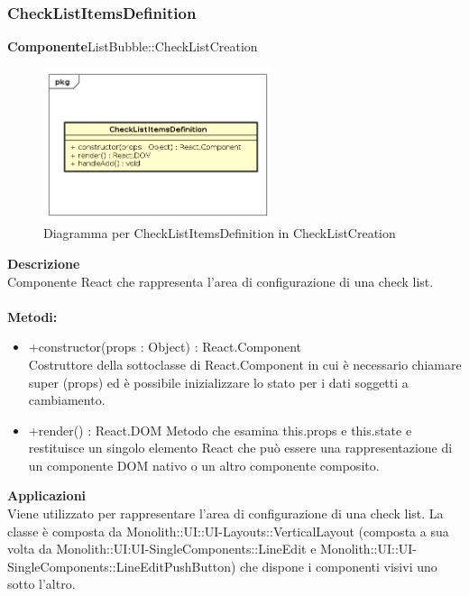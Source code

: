 \subsubsection{CheckListItemsDefinition}
\textbf{Componente}ListBubble::CheckListCreation\\
   \FloatBarrier
   \begin{figure}[ht]
   \centering
   \includegraphics[width=0.6\textwidth]{img/single-CheckListItemsDefinition}
   \caption{{Diagramma per CheckListItemsDefinition in CheckListCreation}}
\end{figure}
\FloatBarrier
\textbf{Descrizione}\\
Componente React che rappresenta l'area di configurazione di una check list.
\\
\\
\textbf{Metodi:} 
\begin{itemize}
\item +constructor(props : Object) : React.Component 
\\
Costruttore della sottoclasse di React.Component in cui è necessario chiamare super (props) ed è possibile inizializzare lo stato per i dati soggetti a cambiamento.

\item +render() : React.DOM
Metodo che esamina this.props e this.state e restituisce un singolo elemento React che può essere una rappresentazione di un componente DOM nativo o un altro componente composito.

\end{itemize} 


\textbf{Applicazioni}\\
Viene utilizzato per rappresentare l'area di configurazione di una check list. 
La classe è composta da Monolith::UI::UI-Layouts::VerticalLayout (composta a sua volta da Monolith::UI:UI-SingleComponents::LineEdit e Monolith::UI::UI-SingleComponents::LineEditPushButton) che dispone i componenti visivi uno sotto l'altro. 


\clearpage

